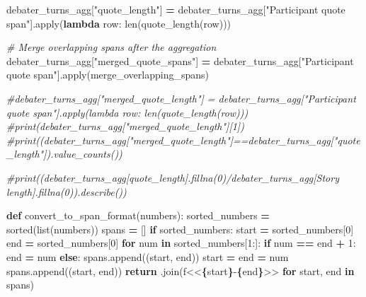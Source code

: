 \documentclass[
]{article}
\newenvironment{Shaded}{\begin{snugshade}}{\end{snugshade}}
\newcommand{\BuiltInTok}[1]{#1}
\newcommand{\CommentTok}[1]{\textcolor[rgb]{0.56,0.35,0.01}{\textit{#1}}}
\newcommand{\ControlFlowTok}[1]{\textcolor[rgb]{0.13,0.29,0.53}{\textbf{#1}}}
\newcommand{\DecValTok}[1]{\textcolor[rgb]{0.00,0.00,0.81}{#1}}
\newcommand{\KeywordTok}[1]{\textcolor[rgb]{0.13,0.29,0.53}{\textbf{#1}}}
\newcommand{\NormalTok}[1]{#1}
\newcommand{\OperatorTok}[1]{\textcolor[rgb]{0.81,0.36,0.00}{\textbf{#1}}}
\newcommand{\SpecialCharTok}[1]{\textcolor[rgb]{0.81,0.36,0.00}{\textbf{#1}}}
\newcommand{\SpecialStringTok}[1]{\textcolor[rgb]{0.31,0.60,0.02}{#1}}
\newcommand{\StringTok}[1]{\textcolor[rgb]{0.31,0.60,0.02}{#1}}
\begin{document}
\begin{Shaded}
\begin{Highlighting}[]
\NormalTok{debater\_turns\_agg[}\StringTok{"quote\_length"}\NormalTok{] }\OperatorTok{=}\NormalTok{ debater\_turns\_agg[}\StringTok{"Participant quote span"}\NormalTok{].}\BuiltInTok{apply}\NormalTok{(}\KeywordTok{lambda}\NormalTok{ row: }\BuiltInTok{len}\NormalTok{(quote\_length(row)))}

\CommentTok{\# Merge overlapping spans after the aggregation}
\NormalTok{debater\_turns\_agg[}\StringTok{"merged\_quote\_spans"}\NormalTok{] }\OperatorTok{=}\NormalTok{ debater\_turns\_agg[}\StringTok{"Participant quote span"}\NormalTok{].}\BuiltInTok{apply}\NormalTok{(merge\_overlapping\_spans)}

\CommentTok{\#debater\_turns\_agg["merged\_quote\_length"] = debater\_turns\_agg["Participant quote span"].apply(lambda row: len(quote\_length(row)))}
\CommentTok{\#print(debater\_turns\_agg["merged\_quote\_length"][1])}
\CommentTok{\#print((debater\_turns\_agg["merged\_quote\_length"]==debater\_turns\_agg["quote\_length"]).value\_counts())}

\CommentTok{\#print((debater\_turns\_agg[\textquotesingle{}quote\_length\textquotesingle{}].fillna(0)/debater\_turns\_agg[\textquotesingle{}Story length\textquotesingle{}].fillna(0)).describe())}


\KeywordTok{def}\NormalTok{ convert\_to\_span\_format(numbers):}
\NormalTok{    sorted\_numbers }\OperatorTok{=} \BuiltInTok{sorted}\NormalTok{(}\BuiltInTok{list}\NormalTok{(numbers))}
\NormalTok{    spans }\OperatorTok{=}\NormalTok{ []}
    \ControlFlowTok{if}\NormalTok{ sorted\_numbers:}
\NormalTok{        start }\OperatorTok{=}\NormalTok{ sorted\_numbers[}\DecValTok{0}\NormalTok{]}
\NormalTok{        end }\OperatorTok{=}\NormalTok{ sorted\_numbers[}\DecValTok{0}\NormalTok{]}
        \ControlFlowTok{for}\NormalTok{ num }\KeywordTok{in}\NormalTok{ sorted\_numbers[}\DecValTok{1}\NormalTok{:]:}
            \ControlFlowTok{if}\NormalTok{ num }\OperatorTok{==}\NormalTok{ end }\OperatorTok{+} \DecValTok{1}\NormalTok{:}
\NormalTok{                end }\OperatorTok{=}\NormalTok{ num}
            \ControlFlowTok{else}\NormalTok{:}
\NormalTok{                spans.append((start, end))}
\NormalTok{                start }\OperatorTok{=}\NormalTok{ end }\OperatorTok{=}\NormalTok{ num}
\NormalTok{        spans.append((start, end))}
    \ControlFlowTok{return} \StringTok{\textquotesingle{} \textquotesingle{}}\NormalTok{.join(}\SpecialStringTok{f\textquotesingle{}\textless{}\textless{}}\SpecialCharTok{\{}\NormalTok{start}\SpecialCharTok{\}}\SpecialStringTok{{-}}\SpecialCharTok{\{}\NormalTok{end}\SpecialCharTok{\}}\SpecialStringTok{\textgreater{}\textgreater{}\textquotesingle{}} \ControlFlowTok{for}\NormalTok{ start, end }\KeywordTok{in}\NormalTok{ spans)}


\end{Highlighting}
\end{Shaded}
\end{document}
